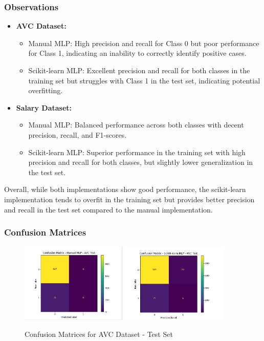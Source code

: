 \documentclass[a4paper,12pt]{article}
\begin{document}
\newpage
\subsubsection{Observations}
\begin{itemize}
    \item \textbf{AVC Dataset:} 
    \begin{itemize}
        \item Manual MLP: High precision and recall for Class 0 but poor performance for Class 1, indicating an inability to correctly identify positive cases.
        \item Scikit-learn MLP: Excellent precision and recall for both classes in the training set but struggles with Class 1 in the test set, indicating potential overfitting.
    \end{itemize}
    \item \textbf{Salary Dataset:} 
    \begin{itemize}
        \item Manual MLP: Balanced performance across both classes with decent precision, recall, and F1-scores.
        \item Scikit-learn MLP: Superior performance in the training set with high precision and recall for both classes, but slightly lower generalization in the test set.
    \end{itemize}
\end{itemize}

Overall, while both implementations show good performance, the scikit-learn implementation tends to overfit in the training set but provides better precision and recall in the test set compared to the manual implementation.

\subsubsection{Confusion Matrices}

\begin{figure}[H]
    \centering
    \includegraphics[width=0.45\textwidth]{Resources/mlp_manual_confusion_avc_test.jpeg}
    \includegraphics[width=0.45\textwidth]{Resources/mlp_scikit_confusion_avc_test.jpeg}
    \caption{Confusion Matrices for AVC Dataset - Test Set}
    \label{fig:mlp_confusion_avc_test}
\end{figure}
\end{document}
